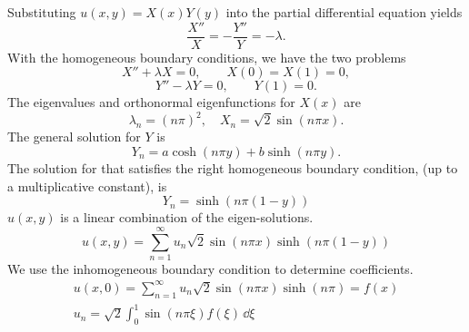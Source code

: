 {\begin{Solution}
  \label{solution laplace separation 0101}
  Substituting $u(x,y) = X(x) Y(y)$ into the partial differential equation yields
  \[
  \frac{X''}{X} = - \frac{Y''}{Y} = -\lambda.
  \]
  With the homogeneous boundary conditions, we have the two problems
  \[
  X'' + \lambda X = 0, \qquad X(0) = X(1) = 0,
  \]
  \[
  Y'' - \lambda Y = 0, \qquad Y(1) = 0.
  \]
  The eigenvalues and orthonormal eigenfunctions for $X(x)$ are
  \[
  \lambda_n = (n \pi)^2, \quad X_n = \sqrt{2} \sin(n \pi x).
  \]
  The general solution for $Y$ is
  \[
  Y_n = a \cosh(n \pi y) + b \sinh(n \pi y).
  \]
  The solution for that satisfies the right homogeneous boundary
  condition, (up to a multiplicative constant), is
  \[
  Y_n = \sinh(n\pi(1-y))
  \]
  $u(x,y)$ is a linear combination of the eigen-solutions.
  \[
  \boxed{
    u(x,y) = \sum_{n=1}^\infty u_n \sqrt{2} \sin(n\pi x) \sinh(n\pi(1-y))
    }
  \]
  We use the inhomogeneous boundary condition to determine coefficients.
  \begin{gather*}
    u(x,0) = \sum_{n=1}^\infty u_n \sqrt{2} \sin(n\pi x) \sinh(n\pi) = f(x) \\
    \boxed{
      u_n = \sqrt{2} \int_0^1 \sin(n \pi \xi) f(\xi) \,\dd \xi
      }
  \end{gather*}
\end{Solution}






}
